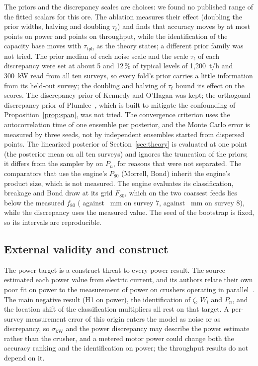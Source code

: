 \documentclass[journal]{IEEEtran}
\newcommand{\pct}{\,\%}
\begin{document}
The priors and the discrepancy scales are choices: we found no published range of the fitted scalars for this ore. The
ablation measures their effect (doubling the prior widths, halving and doubling $\tau_t$) and finds that accuracy moves by at
most \priorShiftMaxKw{} points on power and \priorShiftMaxTph{} points on throughput, while the identification of the
capacity base moves with $\tau_{\mathrm{tph}}$ as the theory states; a different prior family was not tried. The prior
median of each noise scale and the scale $\tau_t$ of each discrepancy were set at about 5 and 12\pct{} of typical levels of
1,200~t/h and 300~kW read from all ten surveys, so every fold's prior carries a little information from its held-out
survey; the doubling and halving of $\tau_t$ bound its effect on the scores. The discrepancy prior of Kennedy and O'Hagan was
kept; the orthogonal discrepancy prior of Plumlee~\cite{plumlee}, which is built to mitigate the confounding of
Proposition~\ref{prop:span}, was not tried. The convergence
criterion uses the autocorrelation time of one ensemble per posterior, and the Monte Carlo error is measured by three seeds,
not by independent ensembles started from dispersed points. The linearized posterior of Section~\ref{sec:theory} is
evaluated at one point (the posterior mean on all ten surveys) and ignores the truncation of the priors; it differs from the
sampler by \thLapMaxDev{} on $P_n$, for reasons that were not separated. The comparators that use the engine's $P_{80}$
(Morrell, Bond) inherit the engine's product size, which is not measured. The engine evaluates its classification,
breakage and Bond draw at its grid $F_{80}$, which on the two coarsest feeds lies below the measured $f_{80}$
(\gridFeightySeven{} against \measFeightySeven~mm on survey 7, \gridFeightyEight{} against \measFeightyEight~mm on survey 8),
while the discrepancy uses the measured value. The seed of the bootstrap is
fixed, so its intervals are reproducible.

\subsection{External validity and construct}

The power target is a construct threat to every power result. The source estimated each power value from electric
current, and its authors relate their own poor fit on power to the measurement of power on crushers operating in
parallel~\cite{rocha}. The main negative result (H1 on power), the identification of $\zeta$, $W_i$ and $P_n$, and the
location shift of the classification multipliers all rest on that target. A per-survey measurement error of this origin
enters the model as noise or as discrepancy, so $\sigma_{\mathrm{kW}}$ and the power discrepancy may describe the power
estimate rather than the crusher, and a metered motor power could change both the accuracy ranking and the identification
on power; the throughput results do not depend on it.
\end{document}
